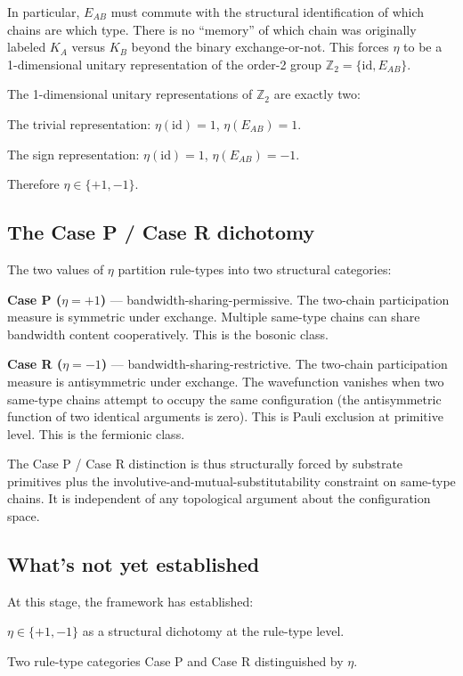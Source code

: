 \documentclass[11pt,a4paper]{article}
\begin{document}
In particular, $E_{AB}$ must commute with the structural identification of which chains are which type. There is no ``memory'' of which chain was originally labeled $K_A$ versus $K_B$ beyond the binary exchange-or-not. This forces $\eta$ to be a 1-dimensional unitary representation of the order-2 group $\mathbb{Z}_2 = \{\mathrm{id}, E_{AB}\}$.

The 1-dimensional unitary representations of $\mathbb{Z}_2$ are exactly two:

The trivial representation: $\eta(\mathrm{id}) = 1$, $\eta(E_{AB}) = 1$.

The sign representation: $\eta(\mathrm{id}) = 1$, $\eta(E_{AB}) = -1$.

Therefore $\eta \in \{+1, -1\}$.

\subsection{The Case P / Case R dichotomy}

The two values of $\eta$ partition rule-types into two structural categories:

\textbf{Case P ($\eta = +1$)} --- bandwidth-sharing-permissive. The two-chain participation measure is symmetric under exchange. Multiple same-type chains can share bandwidth content cooperatively. This is the bosonic class.

\textbf{Case R ($\eta = -1$)} --- bandwidth-sharing-restrictive. The two-chain participation measure is antisymmetric under exchange. The wavefunction vanishes when two same-type chains attempt to occupy the same configuration (the antisymmetric function of two identical arguments is zero). This is Pauli exclusion at primitive level. This is the fermionic class.

The Case P / Case R distinction is thus structurally forced by substrate primitives plus the involutive-and-mutual-substitutability constraint on same-type chains. It is independent of any topological argument about the configuration space.

\subsection{What's not yet established}

At this stage, the framework has established:

$\eta \in \{+1, -1\}$ as a structural dichotomy at the rule-type level.

Two rule-type categories Case P and Case R distinguished by $\eta$.
\end{document}
